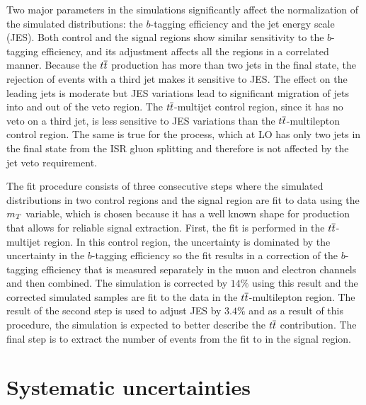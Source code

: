 Two major parameters in the simulations
 significantly affect the
 normalization of the simulated distributions:
 the $b$-tagging efficiency and the jet energy scale (JES).
Both control and the signal regions show similar
 sensitivity to the $b$-tagging efficiency,
 and its adjustment affects all the regions
 in a correlated manner.
Because the $t\overline{t}$ production has more than two jets in the final state,
 the rejection of events with a third jet makes it sensitive to JES.
The effect on the leading jets is moderate but
 JES variations lead to significant migration of jets
 into and out of the veto region.
The $t\overline{t}$-multijet control region,
 since it has no veto on a third jet,
 is less sensitive to JES variations
 than the $t\overline{t}$-multilepton control region.
The same is true for the \wbb process,
 which at LO has only two jets
 in the final state from the ISR gluon splitting
 and therefore is not affected by the
 jet veto requirement.

The fit procedure consists of three consecutive steps
 where the simulated distributions in two control regions
 and the signal region
 are fit to data using the $m_T$ variable,
 which is chosen because it has
 a well known shape for  \wjets production
 that allows for reliable signal extraction.
First, the fit is performed in the $t\overline{t}$-multijet region.
In this control region, the uncertainty is dominated
 by the uncertainty in the $b$-tagging efficiency
 so the fit results in a correction of the
 $b$-tagging efficiency that
 is measured separately in the muon and electron
 channels and then combined. %
The simulation is corrected by $14\%$ using this result
 and the corrected simulated samples are
 fit to the data in the $t\overline{t}$-multilepton region.
The result of the second step is used to adjust JES
 by $3.4\%$
 and as a result of this procedure, the simulation is
 expected to better describe the $t\overline{t}$ contribution.
The final step is to extract the number of
 \wbb events from the fit to \mt in the signal region.


\section{Systematic uncertainties}
\label{sec:systematic_and_statistical_uncertainties}

